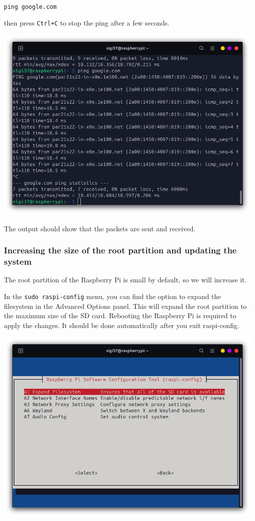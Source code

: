 \documentclass{article}
\begin{document}
\texttt{ping google.com}

then press \texttt{Ctrl+C} to stop the ping after a few seconds.

\includegraphics[scale=0.37]{img/ping_google.png}

The output should show that the packets are sent and received.

\subsubsection{Increasing the size of the root partition and updating the system}

The root partition of the Raspberry Pi is small by default, so we will increase it.

In the \texttt{sudo raspi-config} menu, you can find the option to expand the filesystem in the
Advanced Options panel. This will expand the root partition to the maximum size of the SD card.
Rebooting the Raspberry Pi is required to apply the changes. It should be done automatically after
you exit raspi-config.

\includegraphics[scale=0.37]{img/raspi_config_expand.png}
\end{document}
